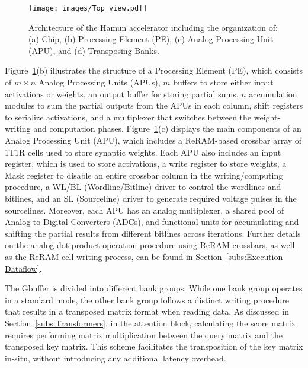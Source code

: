 \begin{figure}[t!]
    \centering
    \texttt{[image: images/Top\_view.pdf]}
    \vskip -0.10in
    \caption{Architecture of the Hamun accelerator including the organization of: (a) Chip, (b) Processing Element (PE), (c) Analog Processing Unit (APU), and (d) Transposing Banks.}
    \vskip -0.15in
    \label{fig:Top_view}
\end{figure}

Figure~\ref{fig:Top_view}(b) illustrates the structure of a Processing Element (PE), which consists of $m \times n$ Analog Processing Units (APUs), $m$ buffers to store either input activations or weights, an output buffer for storing partial sums, $n$ accumulation modules to sum the partial outputs from the APUs in each column, shift registers to serialize activations, and a multiplexer that switches between the weight-writing and computation phases. Figure~\ref{fig:Top_view}(c) displays the main components of an Analog Processing Unit (APU), which includes a ReRAM-based crossbar array of 1T1R cells used to store synaptic weights. Each APU also includes an input register, which is used to store activations, a write register to store weights, a Mask register to disable an entire crossbar column in the writing/computing procedure, a WL/BL (Wordline/Bitline) driver to control the wordlines and bitlines, and an SL (Sourceline) driver to generate required voltage pulses in the sourcelines. Moreover, each APU has an analog multiplexer, a shared pool of Analog-to-Digital Converters (ADCs), and functional units for accumulating and shifting the partial results from different bitlines across iterations. Further details on the analog dot-product operation procedure using ReRAM crossbars, as well as the ReRAM cell writing process, can be found in Section~\ref{subs:Execution Dataflow}.

The Gbuffer is divided into different bank groups. While one bank group operates in a standard mode, the other bank group follows a distinct writing procedure that results in a transposed matrix format when reading data. As discussed in Section~\ref{subs:Transformers}, in the attention block, calculating the score matrix requires performing matrix multiplication between the query matrix and the transposed key matrix. This scheme facilitates the transposition of the key matrix in-situ, without introducing any additional latency overhead.

